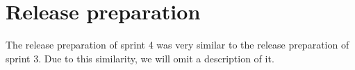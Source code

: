\section{Release preparation}
The release preparation of sprint 4 was very similar to the release preparation of sprint 3. Due to this similarity, we will omit a description of it.
